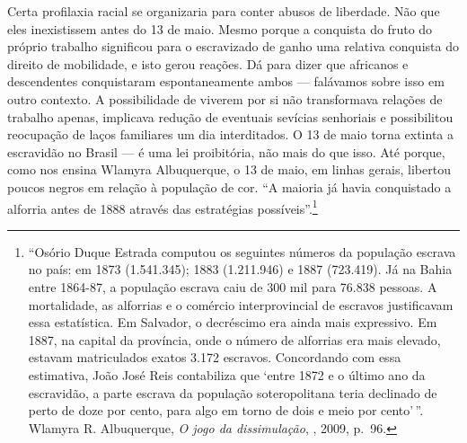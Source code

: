 Certa profilaxia racial se organizaria para conter abusos de liberdade.
Não que eles inexistissem antes do 13 de maio. Mesmo porque a conquista
do fruto do próprio trabalho significou para o escravizado de ganho uma
relativa conquista do direito de mobilidade, e isto gerou reações. Dá
para dizer que africanos e descendentes conquistaram espontaneamente
ambos --- falávamos sobre isso em outro contexto. A possibilidade de
viverem por si não transformava relações de trabalho apenas, implicava
redução de eventuais sevícias senhoriais e possibilitou reocupação de
laços familiares um dia interditados. O 13 de maio torna extinta a
escravidão no Brasil --- é uma lei proibitória, não mais do que isso. Até
porque, como nos ensina Wlamyra Albuquerque, o 13 de maio, em linhas
gerais, libertou poucos negros em relação à população de cor. ``A
maioria já havia conquistado a alforria antes de 1888 através das
estratégias possíveis''.\footnote{``Osório Duque Estrada computou os
  seguintes números da população escrava no país: em 1873 (1.541.345);
  1883 (1.211.946) e 1887 (723.419). Já na Bahia entre 1864-87, a
  população escrava caiu de 300 mil para 76.838 pessoas. A mortalidade,
  as alforrias e o comércio interprovincial de escravos justificavam
  essa estatística. Em Salvador, o decréscimo era ainda mais expressivo.
  Em 1887, na capital da província, onde o número de alforrias era mais
  elevado, estavam matriculados exatos 3.172 escravos. Concordando com
  essa estimativa, João José Reis contabiliza que `entre 1872 e o último
  ano da escravidão, a parte escrava da população soteropolitana teria
  declinado de perto de doze por cento, para algo em torno de dois e
  meio por cento'\,''. Wlamyra R. Albuquerque, \textit{O jogo da
  dissimulação}, , 2009, p.~96.}

